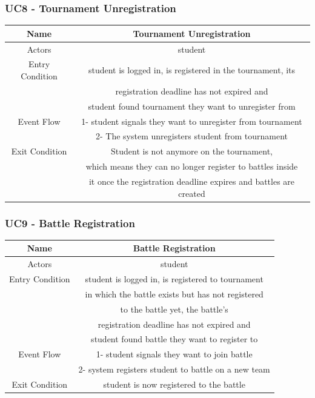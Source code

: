 \documentclass{article}
\begin{document}
\subsubsection*{UC8 - Tournament Unregistration}

\begin{tabular*}{\linewidth}{@{\extracolsep{\fill}} cc }
    \hline
    Name & Tournament Unregistration \\ 
    \hline
    Actors & student\\ 
    \hline
    Entry Condition & student is logged in, is registered in the tournament, its\\
                    & registration deadline has not expired and\\
                    & student found tournament they want to unregister from\\
    \hline
    Event Flow & 1- student signals they want to unregister from tournament\\
               & 2- The system unregisters student from tournament\\
    \hline
    Exit Condition & Student is not anymore on the tournament, \\
                   & which means they can no longer register to battles inside \\
                   & it once the registration deadline expires and battles are created \\
    \hline
\end{tabular*}


\subsubsection*{UC9 - Battle Registration}

\begin{tabular*}{\linewidth}{@{\extracolsep{\fill}} cc }
    \hline
    Name & Battle Registration \\ 
    \hline
    Actors & student\\ 
    \hline
    Entry Condition & student is logged in, is registered to tournament\\
                    & in which the battle exists but has not registered\\
                    & to the battle yet, the battle's\\
                    & registration deadline has not expired and\\
                    & student found battle they want to register to\\
    \hline
    Event Flow & 1- student signals they want to join battle\\
               & 2- system registers student to battle on a new team\\
    \hline
    Exit Condition & student is now registered to the battle\\
    \hline
\end{tabular*}
\end{document}
